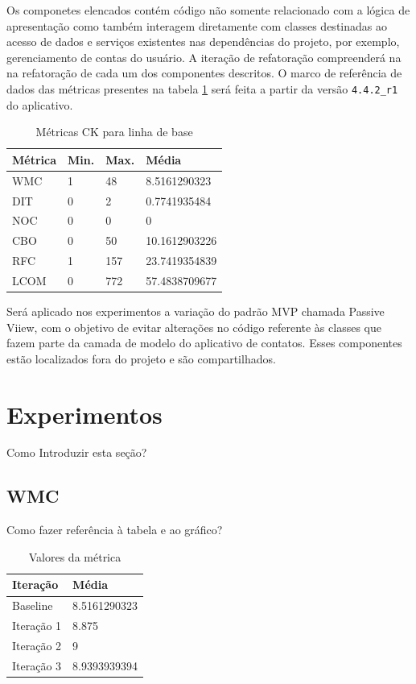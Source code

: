 Os componetes elencados contém código não somente relacionado com a lógica de
apresentação como também interagem diretamente com classes destinadas ao acesso
de dados e serviços existentes nas dependências do projeto, por exemplo,
gerenciamento de contas do usuário. A iteração de refatoração compreenderá na
na refatoração de cada um dos componentes descritos. O marco de referência de
dados das métricas presentes na tabela \ref{tab:dados_baseline} será feita a partir da
versão \verb|4.4.2_r1| do aplicativo.

\begin{table}[h]
	\centering
    \begin{tabular}{ | l | l | l | l |}
    \hline
    Métrica & Min. & Max. & Média \\ \hline
    WMC & 1 & 48  	& 8.5161290323   \\ \hline
    DIT	& 0	& 2		&0.7741935484\\ \hline
	NOC & 0	& 0		& 0\\ \hline
	CBO	& 0	& 50	& 10.1612903226\\ \hline
	RFC	& 1	& 157	& 23.7419354839\\ \hline
	LCOM	& 0		& 772	& 57.4838709677\\ \hline
    \end{tabular}
    \caption{Métricas CK para linha de base}
    \label{tab:dados_baseline}
\end{table}

Será aplicado nos experimentos a variação do padrão MVP chamada Passive Viiew,
com o objetivo de evitar alterações no código referente às classes que fazem
parte da camada de modelo do aplicativo de contatos. Esses componentes estão
localizados fora do projeto e são compartilhados.


\section{Experimentos}

Como Introduzir esta seção?

\subsection{WMC}

Como fazer referência à tabela e ao gráfico?
\begin{table}[h]
	\centering
    \begin{tabular}{ | l | l | }
    \hline
    Iteração & Média 			\\ \hline
    Baseline & 8.5161290323   	\\ \hline
    Iteração 1 & 8.875			\\ \hline
	Iteração 2 & 9				\\ \hline
	Iteração 3 & 8.9393939394	\\ \hline
    \end{tabular}
    \caption{Valores da métrica}
    \label{tab:dados_iteracao1}
\end{table}

